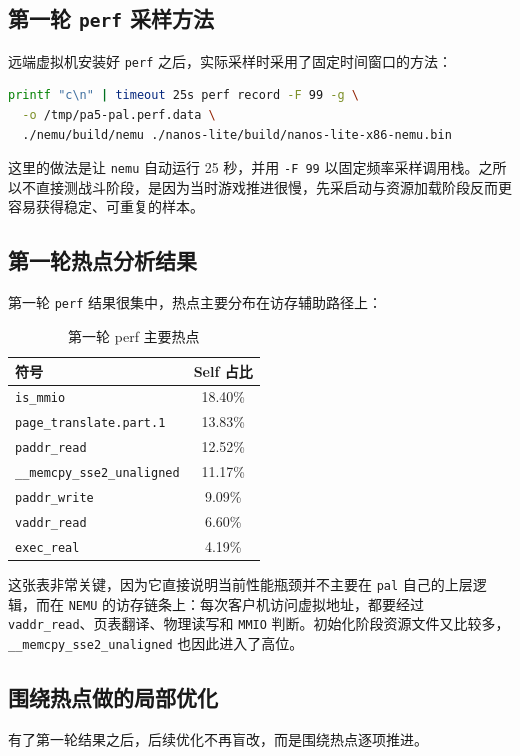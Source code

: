 \documentclass[a4paper]{article}
\begin{document}
\subsection{第一轮 \texttt{perf} 采样方法}
远端虚拟机安装好 \texttt{perf} 之后，实际采样时采用了固定时间窗口的方法：

\begin{lstlisting}[language=bash]
printf "c\n" | timeout 25s perf record -F 99 -g \
  -o /tmp/pa5-pal.perf.data \
  ./nemu/build/nemu ./nanos-lite/build/nanos-lite-x86-nemu.bin
\end{lstlisting}

这里的做法是让 \texttt{nemu} 自动运行 25 秒，并用 \texttt{-F 99} 以固定频率采样调用栈。之所以不直接测战斗阶段，是因为当时游戏推进很慢，先采启动与资源加载阶段反而更容易获得稳定、可重复的样本。

\subsection{第一轮热点分析结果}
第一轮 \texttt{perf} 结果很集中，热点主要分布在访存辅助路径上：

\begin{table}[H]
  \centering
  \begin{tabular}{lc}
    \toprule
    符号 & Self 占比 \\
    \midrule
    \texttt{is\_mmio} & 18.40\% \\
    \texttt{page\_translate.part.1} & 13.83\% \\
    \texttt{paddr\_read} & 12.52\% \\
    \texttt{\_\_memcpy\_sse2\_unaligned} & 11.17\% \\
    \texttt{paddr\_write} & 9.09\% \\
    \texttt{vaddr\_read} & 6.60\% \\
    \texttt{exec\_real} & 4.19\% \\
    \bottomrule
  \end{tabular}
  \caption{第一轮 perf 主要热点}
\end{table}

这张表非常关键，因为它直接说明当前性能瓶颈并不主要在 \texttt{pal} 自己的上层逻辑，而在 \texttt{NEMU} 的访存链条上：每次客户机访问虚拟地址，都要经过 \texttt{vaddr\_read}、页表翻译、物理读写和 \texttt{MMIO} 判断。初始化阶段资源文件又比较多，\texttt{\_\_memcpy\_sse2\_unaligned} 也因此进入了高位。

\subsection{围绕热点做的局部优化}
有了第一轮结果之后，后续优化不再盲改，而是围绕热点逐项推进。
\end{document}
